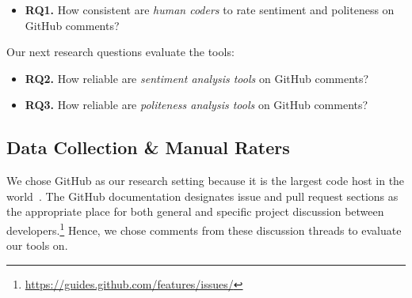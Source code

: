 \begin{itemize}

\item\textbf{RQ1.} How consistent are \emph{human coders} to rate sentiment and politeness on GitHub comments?

\end{itemize}

\noindent
Our next research questions evaluate the tools:

\begin{itemize}

\item\textbf{RQ2.} How reliable are \emph{sentiment analysis tools} on GitHub comments?

\item\textbf{RQ3.} How reliable are \emph{politeness analysis tools} on GitHub comments? 

\end{itemize}

\subsection{Data Collection \& Manual Raters}\label{data}

We chose GitHub as our research setting 
because it is the largest code host 
in the world~\cite{gousios2014lean}. 
The GitHub  documentation designates 
issue and pull request sections 
as the appropriate place for 
both general and specific project discussion
 between developers.\footnote{\url{https://guides.github.com/features/issues/}}
 Hence, we chose comments from these discussion threads 
 to evaluate our tools on. 



